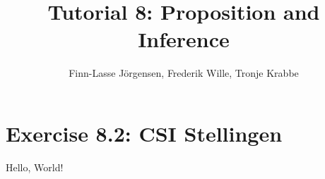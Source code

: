 \documentclass[12pt,a4paper]{article}
\author{Finn-Lasse Jörgensen, Frederik Wille, Tronje Krabbe}
\title{Tutorial 8: Proposition and Inference}
\begin{document}
\maketitle

\section*{Exercise 8.2: CSI Stellingen}
Hello, World!
\end{document}
